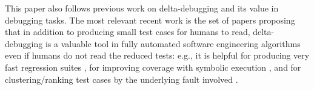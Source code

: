 This paper also follows previous work on delta-debugging
\cite{DD,DDISSTA,Yesterday} and its value in debugging tasks.  The
most relevant recent work is the set of papers proposing that in
addition to producing small test cases for humans to read,
delta-debugging is a valuable tool in fully automated software
engineering algorithms even if humans do not read the reduced tests:
e.g., it is helpful for producing very fast regression suites
\cite{icst2014}, for improving coverage with symbolic execution
\cite{issta14}, and for clustering/ranking test cases by the
underlying fault involved \cite{PLDI13}.
